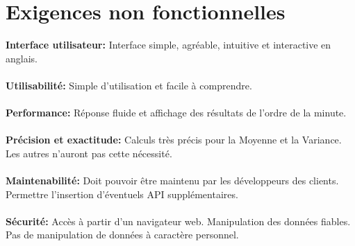 	\section{Exigences non fonctionnelles}
	\begin{frame}
		\textbf{Interface utilisateur:} Interface simple, agréable, intuitive et interactive en anglais.\\~\\ 
		\pause
		\textbf{Utilisabilité:} Simple d'utilisation et facile à comprendre.\\~\\
		\pause
		\textbf{Performance:} Réponse fluide et affichage des résultats de l'ordre de la minute.\\~\\
		\pause
		\textbf{Précision et exactitude:} Calculs très précis pour la Moyenne et la Variance. Les autres n'auront pas cette nécessité.\\~\\
		\pause
		\textbf{Maintenabilité:} Doit pouvoir être maintenu par les développeurs des clients. Permettre l'insertion d'éventuels API supplémentaires.\\~\\
		\pause
		\textbf{Sécurité:} Accès à partir d'un navigateur web. Manipulation des données fiables. Pas de manipulation de données à caractère personnel.\\
	\end{frame}
	

